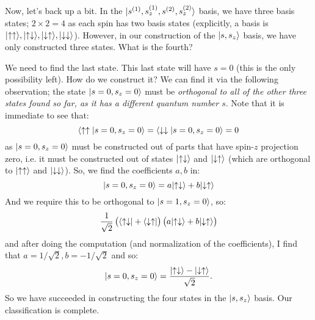 Now, let's back up a bit. In the $\lvert s^{(1)}, s_z^{(1)}, s^{(2)}, s_z^{(2)} \rangle$ basis, we have three basis states; $2 \times 2 = 4$ as each spin has two basis states (explicitly, a basis is $\lvert \uparrow\uparrow \rangle, \lvert \uparrow\downarrow \rangle, \lvert \downarrow\uparrow \rangle, \lvert \downarrow\downarrow \rangle$). However, in our construction of the $\lvert s, s_z \rangle$ basis, we have only constructed three states. What is the fourth?

We need to find the last state. This last state will have $s = 0$ (this is the only possibility left). How do we construct it? We can find it via the following observation; the state $\lvert s = 0, s_z = 0 \rangle$ must be \emph{orthogonal to all of the other three states found so far, as it has a different quantum number $s$}. Note that it is immediate to see that:
\begin{equation}
    \langle \uparrow\uparrow \lvert s=0, s_z = 0 \rangle = \langle \downarrow\downarrow \lvert s=0, s_z=0 \rangle = 0
\end{equation}
as $\lvert s = 0, s_z = 0 \rangle$ must be constructed out of parts that have spin-$z$ projection zero, i.e. it must be constructed out of states $\lvert \uparrow\downarrow \rangle$ and $\lvert \downarrow\uparrow \rangle$ (which are orthogonal to $\lvert \uparrow\uparrow \rangle$ and $\lvert \downarrow\downarrow \rangle$). So, we find the coefficients $a, b$ in:
\begin{equation}
    \lvert s=0, s_z = 0 \rangle = a\lvert \uparrow\downarrow \rangle + b\lvert \downarrow\uparrow \rangle
\end{equation}
And we require this to be orthogonal to $\lvert s=1, s_z = 0 \rangle$, so:
\begin{equation}
    \frac{1}{\sqrt{2}}\left(\langle \uparrow\downarrow \rvert + \langle \downarrow\uparrow \rvert\right)\left( a\lvert \uparrow\downarrow \rangle + b\lvert \downarrow\uparrow \rangle\right)
\end{equation}
and after doing the computation (and normalization of the coefficients), I find that $a = 1/\sqrt{2}, b = -1/\sqrt{2}$ and so:
\begin{equation}
    \lvert s=0, s_z = 0 \rangle = \frac{\lvert \uparrow\downarrow \rangle - \lvert \downarrow\uparrow \rangle}{\sqrt{2}}.
\end{equation}
So we have succeeded in constructing the four states in the $\lvert s, s_z \rangle$ basis. Our classification is complete.

